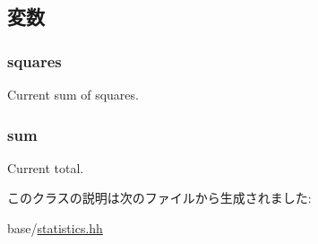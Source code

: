 \subsection{変数}
\hypertarget{classStats_1_1AvgSampleStor_a0c02ec1e072d692448ce4429a78e3675}{
\subsubsection[{squares}]{ {\bf squares}}}
\label{classStats_1_1AvgSampleStor_a0c02ec1e072d692448ce4429a78e3675}
Current sum of squares. \hypertarget{classStats_1_1AvgSampleStor_ab5b201cce7e10c48f62b71605e75707e}{
\subsubsection[{sum}]{ {\bf sum}}}
\label{classStats_1_1AvgSampleStor_ab5b201cce7e10c48f62b71605e75707e}
Current total. 

このクラスの説明は次のファイルから生成されました:\begin{DoxyCompactItemize}
\item 
base/\hyperlink{statistics_8hh}{statistics.hh}\end{DoxyCompactItemize}
